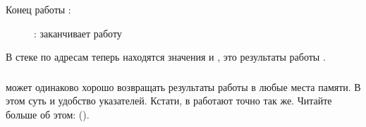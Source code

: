 \clearpage
Конец работы \ttfone:

\begin{figure}[H]
\centering
{}
\caption{\olly: \ttfone заканчивает работу}
\label{fig:pointers_olly_stk_3}
\end{figure}

В стеке по адресам \PtrsAddresses теперь находятся значения  и , это результаты работы \ttfone.

\subsubsection{\Conclusion{}}

\ttfone может одинаково хорошо возвращать результаты работы в любые места памяти. 
В этом суть и удобство указателей.
Кстати,  в \Cpp работают точно так же. Читайте больше об этом: ().

